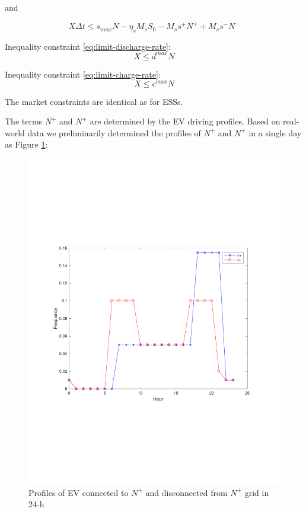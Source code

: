 and 

\begin{equation*}
[-\frac{1}{\eta_d}M_s | \eta_c M_s | -\frac{1}{\eta_d}M_s | \eta_c M_s | -\frac{1}{\eta_d}  \delta^{RU} M_s + \eta_c (\delta^{RD}+\delta^r) M_s ] X \Delta t \leq s_{max} N - \eta_s M_s S_0 - M_s s^+ N^+ + M_s s^- N^-
\end{equation*}

Inequality constraint \eqref{eq:limit-discharge-rate}:
\begin{equation*}
[I_T | O_T | I_T | O_T | \delta_t^{RU}I_T]X \leq d^{max} N
\end{equation*}

Inequality constraint \eqref{eq:limit-charge-rate}:
\begin{equation*}
[O_T | I_T | O_T | I_T | \delta_t^{RD}I_T]X \leq c^{max} N
\end{equation*}

The market constraints are identical as for ESSs.
 
 The terms $N^+$ and $N^+$ are determined by the EV driving profiles. Based on real-world data \cite{Transport-data} we preliminarily determined the profiles of $N^+$ and $N^+$ in a single day as Figure \ref{fig:EV-nb-inout}:
 \begin{figure}[h!]
 	\label{fig:EV-nb-inout}
 	\includegraphics[scale=0.6]{EV_state_nb_inout}
 	\caption{Profiles of EV connected to $N^+$ and disconnected from $N^+$ grid in 24-h}
 \end{figure}
 
